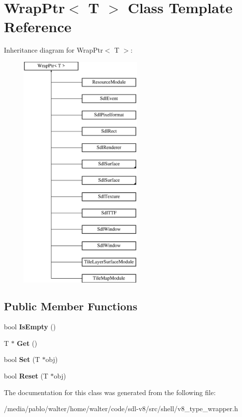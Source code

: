 \hypertarget{classWrapPtr}{}\section{Wrap\+Ptr$<$ T $>$ Class Template Reference}
\label{classWrapPtr}
Inheritance diagram for Wrap\+Ptr$<$ T $>$\+:\begin{figure}[H]
\begin{center}
\leavevmode
\includegraphics[height=12.000000cm]{classWrapPtr}
\end{center}
\end{figure}
\subsection*{Public Member Functions}
\begin{DoxyCompactItemize}
\item 
\mbox{\label{classWrapPtr_a96aaec13f4d1c22fc4e9c9167901a558}} 
bool {\bfseries Is\+Empty} ()
\item 
\mbox{\label{classWrapPtr_a0df4caf6e9c8a5abfa2a55a22828f824}} 
T $\ast$ {\bfseries Get} ()
\item 
\mbox{\label{classWrapPtr_a336e0c11724d9d3797907c78a94ba0db}} 
bool {\bfseries Set} (T $\ast$obj)
\item 
\mbox{\label{classWrapPtr_a9a7b7c16d907dd0ef43c9270232fb6d2}} 
bool {\bfseries Reset} (T $\ast$obj)
\end{DoxyCompactItemize}


The documentation for this class was generated from the following file\+:\begin{DoxyCompactItemize}
\item 
/media/pablo/walter/home/walter/code/sdl-\/v8/src/shell/v8\+\_\+type\+\_\+wrapper.\+h\end{DoxyCompactItemize}
